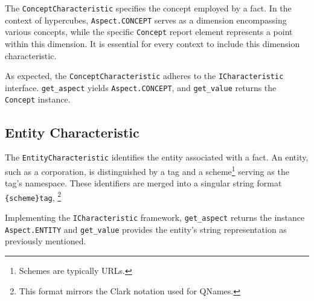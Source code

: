 The \texttt{ConceptCharacteristic} specifies the concept employed by a fact.
In the context of hypercubes, \texttt{Aspect.CONCEPT} serves as a dimension encompassing various concepts,
while the specific \texttt{Concept} report element represents a point within this dimension.
It is essential for every context to include this dimension characteristic.

As expected, the \texttt{ConceptCharacteristic} adheres to the \texttt{ICharacteristic} interface.
\texttt{get\_aspect} yields \texttt{Aspect.CONCEPT}, and \texttt{get\_value} returns the \texttt{Concept} instance.



\subsection{Entity Characteristic}

The \texttt{EntityCharacteristic} identifies the entity associated with a fact.
An entity, such as a corporation, is distinguished by a tag and a scheme\footnote{Schemes are typically URLs.} serving as the tag's namespace.
These identifiers are merged into a singular string format \texttt{\{scheme\}tag},
\footnote{This format mirrors the Clark notation used for QNames\cite{w3_qnames}.}

Implementing the \texttt{ICharacteristic} framework,
\texttt{get\_aspect} returns the instance \texttt{Aspect.ENTITY} and \texttt{get\_value} provides the entity's string representation as previously mentioned.

